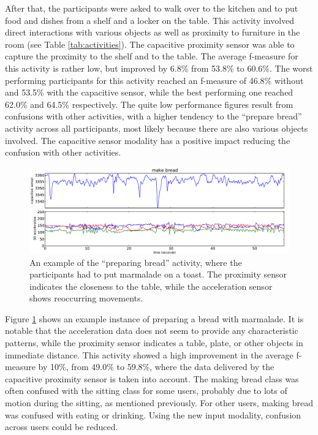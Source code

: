 \documentclass[runningheads,a4paper]{llncs}
\begin{document}
After that, the participants were asked to walk over to the kitchen and to put food and dishes from a shelf and a locker on the table. This activity involved direct interactions with various objects as well as proximity to furniture in the room (see Table \ref{tab:activities}). The capacitive proximity sensor was able to capture the proximity to the shelf and to the table. The average f-measure for this activity is rather low, but improved by 6.8\% from 53.8\% to 60.6\%. The worst performing participants for this activity reached an f-measure of 46.8\% without and 53.5\% with the capacitive sensor, while the best performing one reached 62.0\% and 64.5\% respectively. The quite low performance figures result from confusions with other activities, with a higher tendency to the ``prepare bread'' activity across all participants, most likely because there are also various objects involved. The capacitive sensor modality has a positive impact reducing the confusion with other activities.

\begin{figure}
	\centering
		\includegraphics[width=\textwidth]{../Auswertung/images/eugen_5.pdf}
	\caption{An example of the ``preparing bread'' activity, where the participants had to put marmalade on a toast. The proximity sensor indicates the closeness to the table, while the acceleration sensor shows reoccurring movements.}
	\label{fig:prep_bread}
\end{figure}

Figure \ref{fig:prep_bread} shows an example instance of preparing a bread with marmalade. It is notable that the acceleration data does not seem to provide any characteristic patterns, while the proximity sensor indicates a table, plate, or other objects in immediate distance. This activity showed a high improvement in the average f-measure by 10\%, from 49.0\% to 59.8\%, where the data delivered by the capacitive proximity sensor is taken into account. The making bread class was often confused with the sitting class for some users, probably due to lots of motion during the sitting, as mentioned previously. For other users, making bread was confused with eating or drinking. Using the new input modality, confusion across users could be reduced.
\end{document}
